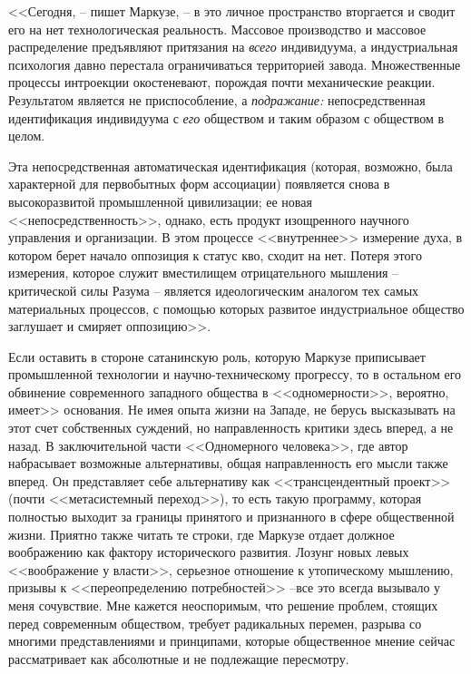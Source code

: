 \documentclass{book}
\begin{document}
<<Сегодня, -- пишет Маркузе, -- в это личное пространство вторгается и сводит его на нет технологическая реальность. Массовое производство и массовое распределение предъявля­ют притязания на \textit{всего}  индивидуума, а индустриальная психо­логия давно перестала ограничиваться территорией завода. Множественные процессы интроекции окостеневают, по\-рож\-­дая почти механические реакции. Результатом является не при­способление, а \textit{подражание:}  непосредственная идентификация индивидуума с \textit{его}  обществом и таким образом с обществом в целом.

Эта непосредственная автоматическая идентификация (ко­торая, возможно, была характерной для первобытных форм ассоциации) появляется снова в высокоразвитой про\-мыш\-лен\-­ной цивилизации; ее новая <<непосредственность>>, однако, есть продукт изощренного научного управления и организа­ции. В этом процессе <<внутреннее>> измерение духа, в котором берет начало оппозиция к статус кво, сходит на нет. Потеря этого измерения, которое служит вместилищем отрицатель­ного мышления -- критической силы Разума -- является иде­ологическим аналогом тех самых материальных процессов, с помощью которых развитое индустриальное общество заглу­шает и смиряет оппозицию>>.%

Если оставить в стороне сатанинскую роль, которую Маркузе приписывает промышленной технологии и научно-техниче­скому прогрессу, то в остальном его обвинение современного западного общества в <<одномерности>>, вероятно, имеет>> осно­вания. Не имея опыта жизни на Западе, не берусь высказывать на этот счет собственных суждений, но направленность критики здесь вперед, а не назад. В заключительной части <<Одномерно­го человека>>, где автор набрасывает возможные альтернативы, общая направленность его мысли также вперед. Он представ­ляет себе альтернативу как <<трансцендентный проект>> (почти <<метасистемный переход>>), то есть такую программу, кото­рая полностью выходит за границы принятого и признанного в сфере общественной жизни. Приятно также читать те строки, где Маркузе отдает должное воображению как фактору исто­рического развития. Лозунг новых левых <<воображение у власти>>, серьезное отношение к утопическому мышлению, призывы к <<переопределению потребностей>> --все это всегда вызывало у меня сочувствие. 
Мне кажется 
неоспоримым, что решение проблем, стоящих перед современным обществом, требует радикальных перемен, разрыва со многими представ­лениями и принципами, которые общественное мнение сейчас рассматривает как абсолютные и не подлежащие пересмотру.
\end{document}
